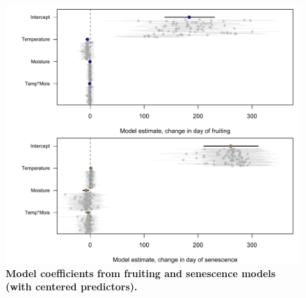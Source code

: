 \documentclass{article}
\begin{document}
\begin{figure}[h]
\centering
 \includegraphics{../../Analyses/soilmoisture/figures/m5bffrdsen.pdf}
 \caption{\textbf{Model coefficients from fruiting and senescence models (with centered predictors).}} 
 \label{fig:ff}
 \end{figure}


\end{document}
